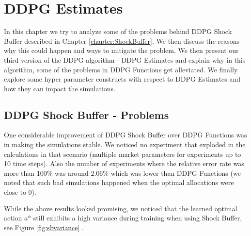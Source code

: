 \makeatletter
\newenvironment{breakablealgorithm}
  {%
   \begin{center}
     \refstepcounter{algorithm}%
     \hrule height.8pt depth0pt \kern2pt%
     \renewcommand{\caption}[2][\relax]{%
       {\raggedright\textbf{\ALG@name~\thealgorithm} ##2\par}%
       \ifx\relax##1\relax %
         \addcontentsline{loa}{algorithm}{\protect\numberline{\thealgorithm}##2}%
       \else %
         \addcontentsline{loa}{algorithm}{\protect\numberline{\thealgorithm}##1}%
       \fi
       \kern2pt\hrule\kern2pt
     }
  }{%
     \kern2pt\hrule\relax%
   \end{center}
  }
\makeatother
\chapter{DDPG Estimates}\label{chapter:Estimates}
In this chapter we try to analyze some of the problems behind DDPG Shock Buffer described in Chapter \ref{chapter:ShockBuffer}. We then discuss the reasons why this could happen and ways to mitigate the problem. We then present our third version of the DDPG algorithm - DDPG Estimates and explain why in this algorithm, some of the problems in DDPG Functions get alleviated. We finally explore some hyper parameter constructs with respect to DDPG Estimates and how they can impact the simulations.

\section{DDPG Shock Buffer - Problems}

One considerable improvement of DDPG Shock Buffer over DDPG Functions was in making the simulations stable. We noticed no experiment that exploded in the calculations in that scenario (multiple market parameters for experiments up to 10 time steps). Also the number of experiments where the relative error rate was more than 100\% was around 2.06\% which was lower than DDPG Functions (we noted that such bad simulations happened when the optimal allocations were close to 0).

While the above results looked promising, we noticed that the learned optimal action $a^\phi$ still exhibits a high variance during training when using Shock Buffer, see Figure \ref{fig:sbvariance} . 

